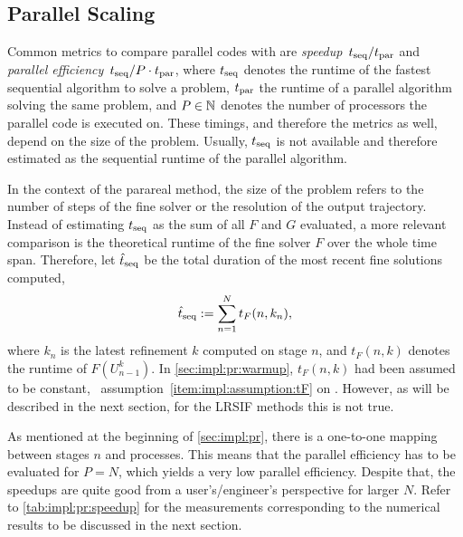 \subsection{Parallel Scaling}

Common metrics to compare parallel codes with are \emph{speedup}~$t_\text{seq}/t_\text{par}$
and \emph{parallel efficiency}~$t_\text{seq}/P\cdot t_\text{par}$,
where $t_\text{seq}$ denotes the runtime of the fastest sequential algorithm to solve a problem,
$t_\text{par}$ the runtime of a parallel algorithm solving the same problem,
and $P\in\mathbb{N}$ denotes the number of processors the parallel code is executed on.
These timings, and therefore the metrics as well, depend on the size of the problem.
Usually, $t_\text{seq}$ is not available and therefore estimated as the sequential runtime of the parallel algorithm.

In the context of the parareal method,
the size of the problem refers to the number of steps of the fine solver or the resolution of the output trajectory.
Instead of estimating $t_\text{seq}$ as the sum of all $F$ and $G$ evaluated,
a more relevant comparison is the theoretical runtime of the fine solver $F$ over the whole time span.
Therefore, let $\hat t_\text{seq}$ be the total duration of the most recent fine solutions computed,
\begin{equation}
\label{eq:impl:tseq}
  \hat t_\text{seq} := \sum_{n=1}^N t_F(n, k_n)
  ,
\end{equation}
where $k_n$ is the latest refinement $k$ computed on stage $n$,
and $t_F(n,k)$ denotes the runtime of $F(U_{n-1}^k)$.
In \autoref{sec:impl:pr:warmup},
$t_F(n,k)$ had been assumed to be constant,
\cf~assumption~\ref{item:impl:assumption:tF} on .
However, as will be described in the next section,
for the \ac{LRSIF} methods this is not true.

As mentioned at the beginning of \autoref{sec:impl:pr},
there is a one-to-one mapping between stages $n$ and processes.
This means that the parallel efficiency has to be evaluated for $P=N$,
which yields a very low parallel efficiency.
Despite that, the speedups are quite good from a user's/engineer's perspective for larger $N$.
Refer to \autoref{tab:impl:pr:speedup} for the measurements corresponding to the numerical results
to be discussed in the next section.


